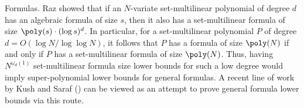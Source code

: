 \documentclass{article}
\begin{document}
\begin{paragraph}{Formulas.}
    Raz \cite{Raz-Tensor} showed that if an $N$-variate set-multilinear polynomial of degree $d$ has an algebraic formula of size $s$, then it also has a set-multilinear formula of size $\poly(s)\cdot (\log s)^{d}$. 
    In particular, for a set-multilinear polynomial $P$ of degree $d = O(\log N/ \log \log N)$, it follows that $P$ has a formula of size $\poly(N)$ if and only if $P$ has a set-multilinear formula of size $\poly(N)$. 
    Thus, having $N^{\omega_d(1)}$ set-multilinear formula size lower bounds for such a low degree would imply super-polynomial lower bounds for general formulas. A recent line of work by Kush and Saraf (\cite{KushS22,KushS23}) can be viewed as an attempt to
prove general formula lower bounds via this route. 

\end{paragraph}
\end{document}
